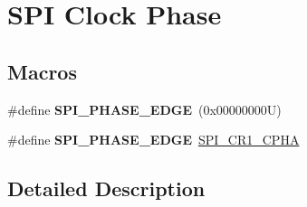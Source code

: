 \hypertarget{group___s_p_i___clock___phase}{}\section{S\+PI Clock Phase}
\label{group___s_p_i___clock___phase}
\subsection*{Macros}
\begin{DoxyCompactItemize}
\item 
\mbox{\label{group___s_p_i___clock___phase_ga208be78b79c51df200a495c4d2110b57}} 
\#define {\bfseries S\+P\+I\+\_\+\+P\+H\+A\+S\+E\+\_\+E\+D\+GE}~(0x00000000\+U)
\item 
\mbox{\label{group___s_p_i___clock___phase_ga960275ac1d01d302c48e713399990c36}} 
\#define {\bfseries S\+P\+I\+\_\+\+P\+H\+A\+S\+E\+\_\+E\+D\+GE}~\hyperlink{group___peripheral___registers___bits___definition_ga97602d8ded14bbd2c1deadaf308755a3}{S\+P\+I\+\_\+\+C\+R1\+\_\+\+C\+P\+HA}
\end{DoxyCompactItemize}


\subsection{Detailed Description}
